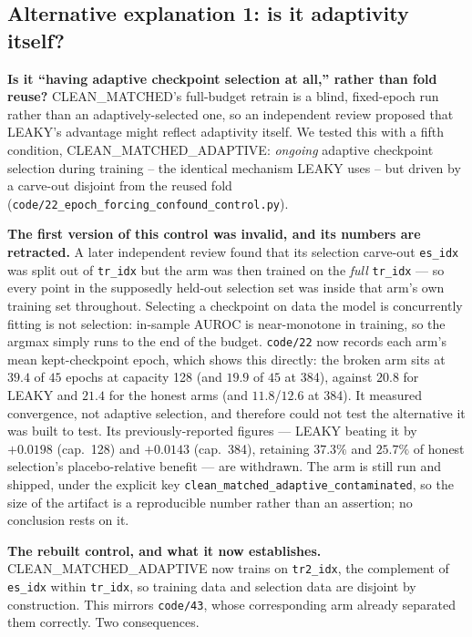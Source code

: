 \documentclass[10pt]{article} %
\begin{document}
\subsection{Alternative explanation 1: is it adaptivity itself?}

\textbf{Is it ``having adaptive checkpoint selection at all,'' rather than
fold reuse?} CLEAN\_MATCHED's full-budget retrain is a blind, fixed-epoch run
rather than an adaptively-selected one, so an independent review proposed that
LEAKY's advantage might reflect adaptivity itself. We tested this with a fifth
condition, CLEAN\_MATCHED\_ADAPTIVE: \emph{ongoing} adaptive checkpoint
selection during training -- the identical mechanism LEAKY uses -- but driven
by a carve-out disjoint from the reused fold
(\texttt{code/22\_epoch\_forcing\_confound\_control.py}).

\medskip\noindent\textbf{The first version of this control was invalid, and its
numbers are retracted.} A later independent review found that its selection
carve-out \texttt{es\_idx} was split out of \texttt{tr\_idx} but the arm was
then trained on the \emph{full} \texttt{tr\_idx} --- so every point in the
supposedly held-out selection set was inside that arm's own training set
throughout. Selecting a checkpoint on data the model is concurrently fitting is
not selection: in-sample AUROC is near-monotone in training, so the argmax
simply runs to the end of the budget. \texttt{code/22} now records each arm's
mean kept-checkpoint epoch, which shows this directly: the broken arm sits at
$39.4$ of $45$ epochs at capacity 128 (and $19.9$ of $45$ at 384), against
$20.8$ for LEAKY and $21.4$ for the honest arms (and $11.8$/$12.6$ at 384).
It measured convergence, not adaptive selection, and therefore could not test
the alternative it was built to test. Its previously-reported figures ---
LEAKY beating it by $+0.0198$ (cap.\ 128) and $+0.0143$ (cap.\ 384), retaining
$37.3\%$ and $25.7\%$ of honest selection's placebo-relative benefit --- are
withdrawn. The arm is still run and shipped, under the explicit key
\texttt{clean\_matched\_adaptive\_contaminated}, so the size of the artifact is
a reproducible number rather than an assertion; no conclusion rests on it.

\medskip\noindent\textbf{The rebuilt control, and what it now establishes.}
CLEAN\_MATCHED\_ADAPTIVE now trains on \texttt{tr2\_idx}, the complement of
\texttt{es\_idx} within \texttt{tr\_idx}, so training data and selection data
are disjoint by construction. This mirrors \texttt{code/43}, whose
corresponding arm already separated them correctly. Two consequences.
\end{document}

